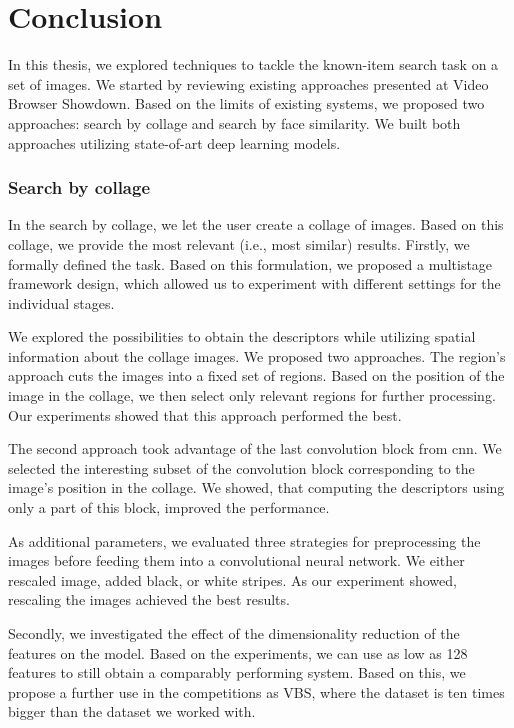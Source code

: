 \chapter*{Conclusion}

In this thesis, we explored techniques to tackle the known-item search task on a set of images. We started by reviewing existing approaches presented at Video Browser Showdown. Based on the limits of existing systems, we proposed two approaches: search by collage and search by face similarity. We built both approaches utilizing state-of-art deep learning models. 

\subsection*{Search by collage}

In the search by collage, we let the user create a collage of images. Based on this collage, we provide the most relevant (i.e., most similar) results. Firstly, we formally defined the task. Based on this formulation, we proposed a multistage framework design, which allowed us to experiment with different settings for the individual stages.

We explored the possibilities to obtain the descriptors while utilizing spatial information about the collage images. We proposed two approaches. The region's approach cuts the images into a fixed set of regions. Based on the position of the image in the collage, we then select only relevant regions for further processing. Our experiments showed that this approach performed the best. 

The second approach took advantage of the last convolution block from \acrshort{cnn}. We selected the interesting subset of the convolution block corresponding to the image's position in the collage. We showed, that computing the descriptors using only a part of this block, improved the performance. 

As additional parameters, we evaluated three strategies for preprocessing the images before feeding them into a convolutional neural network. We either rescaled image, added black, or white stripes. As our experiment showed, rescaling the images achieved the best results.

Secondly, we investigated the effect of the dimensionality reduction of the features on the model. Based on the experiments, we can use as low as 128 features to still obtain a comparably performing system. Based on this, we propose a further use in the competitions as VBS, where the dataset is ten times bigger than the dataset we worked with.

